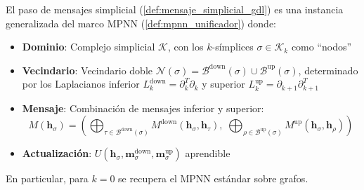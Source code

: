 \begin{proposition}\label{prop:tdl_mpnn}
El paso de mensajes simplicial (\autoref{def:mensaje_simplicial_gdl}) es una instancia generalizada del marco \gls{MPNN} (\autoref{def:mpnn_unificador}) donde:
\begin{itemize}
    \item \textbf{Dominio}: Complejo simplicial $\mathcal{K}$, con los $k$-símplices $\sigma \in \mathcal{K}_k$ como ``nodos''
    \item \textbf{Vecindario}: Vecindario doble $\mathcal{N}(\sigma) = \mathcal{B}^{\mathrm{down}}(\sigma) \cup \mathcal{B}^{\mathrm{up}}(\sigma)$, determinado por los Laplacianos inferior $L_k^{\mathrm{down}} = \partial_k^T \partial_k$ y superior $L_k^{\mathrm{up}} = \partial_{k+1} \partial_{k+1}^T$
    \item \textbf{Mensaje}: Combinación de mensajes inferior y superior:
    \[
    M(\mathbf{h}_\sigma) = \left(\bigoplus_{\tau \in \mathcal{B}^{\mathrm{down}}(\sigma)} M^{\mathrm{down}}(\mathbf{h}_\sigma, \mathbf{h}_\tau),\; \bigoplus_{\rho \in \mathcal{B}^{\mathrm{up}}(\sigma)} M^{\mathrm{up}}(\mathbf{h}_\sigma, \mathbf{h}_\rho)\right)
    \]
    \item \textbf{Actualización}: $U(\mathbf{h}_\sigma, \mathbf{m}_\sigma^{\mathrm{down}}, \mathbf{m}_\sigma^{\mathrm{up}})$ aprendible
\end{itemize}
En particular, para $k=0$ se recupera el \gls{MPNN} estándar sobre grafos.
\end{proposition}

